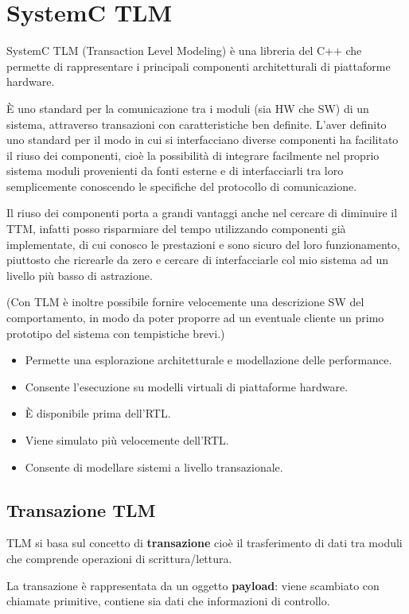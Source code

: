 \documentclass[a4paper]{article}
\theoremstyle{definition}
\begin{document}
	
	\section{SystemC TLM}
		SystemC TLM (Transaction Level Modeling) è una libreria del C++ che permette di rappresentare i principali componenti architetturali di piattaforme hardware. 
		
		È uno standard per la comunicazione tra i moduli (sia HW che SW) di un sistema, attraverso transazioni con caratteristiche ben definite. L'aver definito uno standard per il modo in cui si interfacciano diverse componenti ha facilitato il riuso dei componenti, cioè la possibilità di integrare facilmente nel proprio sistema moduli provenienti da fonti esterne e di interfacciarli tra loro semplicemente conoscendo le specifiche del protocollo di comunicazione.
		
		Il riuso dei componenti porta a grandi vantaggi anche nel cercare di diminuire il TTM, infatti posso risparmiare del tempo utilizzando componenti già implementate, di cui conosco le prestazioni e sono sicuro del loro funzionamento, piuttosto che ricrearle da zero e cercare di interfacciarle col mio sistema ad un livello più basso di astrazione.
		
		(Con TLM è inoltre possibile fornire velocemente una descrizione SW del comportamento, in modo da poter proporre ad un eventuale cliente un primo prototipo del sistema con tempistiche brevi.)
		
		\begin{itemize}
			\item Permette una esplorazione architetturale e modellazione delle performance.
			\item Consente l'esecuzione su modelli virtuali di piattaforme hardware.
			\item È disponibile prima dell'RTL.
			\item Viene simulato più velocemente dell'RTL.
			\item Consente di modellare sistemi a livello transazionale.
		\end{itemize}
		
		\subsection{Transazione TLM}
			TLM si basa sul concetto di \textbf{transazione} cioè il trasferimento di dati tra moduli che comprende operazioni di scrittura/lettura. 
			
			\noindent
			La transazione è rappresentata da un oggetto \textbf{payload}: viene scambiato con chiamate primitive, contiene sia dati che informazioni di controllo.
			
\end{document}
